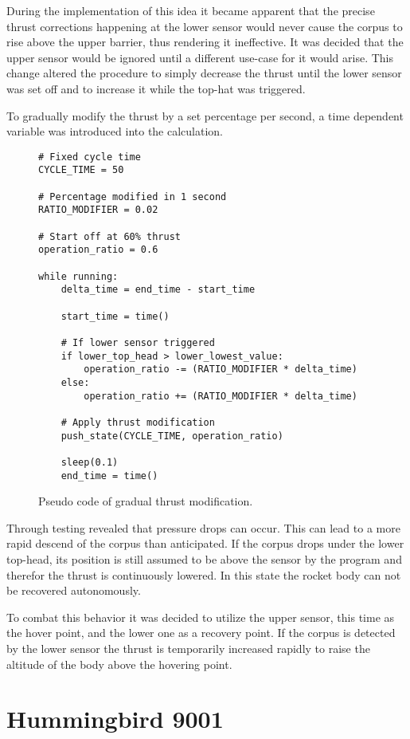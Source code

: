 During the implementation of this idea it became apparent that the precise thrust corrections happening at the lower sensor would never cause the corpus to rise above the upper barrier, thus rendering it ineffective. It was decided that the upper sensor would be ignored until a different use-case for it would arise. This change altered the procedure to simply decrease the thrust until the lower sensor was set off and to increase it while the top-hat was triggered.

To gradually modify the thrust by a set percentage per second, a time dependent variable was introduced into the calculation. 

\begin{figure}[h]
\begin{verbatim}
# Fixed cycle time
CYCLE_TIME = 50

# Percentage modified in 1 second
RATIO_MODIFIER = 0.02

# Start off at 60% thrust
operation_ratio = 0.6

while running:
    delta_time = end_time - start_time
    
    start_time = time()

    # If lower sensor triggered
    if lower_top_head > lower_lowest_value:
        operation_ratio -= (RATIO_MODIFIER * delta_time)
    else:
        operation_ratio += (RATIO_MODIFIER * delta_time)

    # Apply thrust modification
    push_state(CYCLE_TIME, operation_ratio)

    sleep(0.1)
    end_time = time()
\end{verbatim}
\caption{Pseudo code of gradual thrust modification.}
\end{figure}

Through testing revealed that pressure drops can occur. This can lead to a more rapid descend of the corpus than anticipated. If the corpus drops under the lower top-head, its position is still assumed to be above the sensor by the program and therefor the thrust is continuously lowered. In this state the rocket body can not be recovered autonomously. 

To combat this behavior it was decided to utilize the upper sensor, this time as the hover point, and the lower one as a recovery point. If the corpus is detected by the lower sensor the thrust is temporarily increased rapidly to raise the altitude of the body above the hovering point. 



\chapter{Hummingbird 9001}

